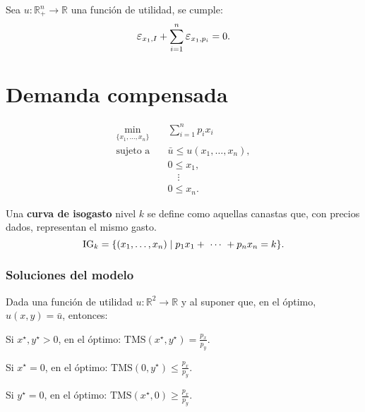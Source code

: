 \documentclass[8pt,a4paper]{extarticle}
\begin{document}
\begin{multicols}{3}
\begin{boxtheo}
	Sea $u : \mathbb{R}^n_+ \to \mathbb{R}$ una función de utilidad, se cumple:
	\[
		\E_{x_1, I} + \sum_{i=1}^{n} \E_{x_1, p_{i}} = 0
	.\] 
\end{boxtheo}

\newpage

\section{Demanda compensada}

\begin{equation*}
\begin{aligned}
	\min_{\{x_1, \ldots, x_n\}}\	  & \sum_{i=1}^{n} p_i x_i \\
	\text{sujeto a} \quad & \bar{u} \le u(x_1, \ldots, x_n), \\
						  & 0 \le x_1, \\
						  & \quad \vdots \\
						  & 0 \le x_n.
\end{aligned}
\end{equation*}

\begin{boxdef}
Una \textbf{curva de isogasto} nivel $k$ se define como aquellas canastas que, con precios dados, representan el mismo gasto. \\
$$\text{\normalfont IG}_k = \{(x_1, \ldots, x_n)  \mid p_1 x_1 +\ \cdots\ + p_n x_n = k\}.$$
\end{boxdef}

\subsubsection*{Soluciones del modelo}

Dada una función de utilidad $u : \mathbb{R}^2 \to \mathbb{R}$ y al suponer que, en el óptimo, $u(x, y) = \bar{u}$, entonces:

\begin{bulletlist}
\item Si $x^\star, y^\star > 0$, en el óptimo: $\displaystyle \text{TMS} (x^\star, y^\star) = \frac{p_x}{p_y}$.
\item Si $x^\star = 0$, en el óptimo: $\displaystyle \text{TMS} \left(0, y^\star \right) \le \frac{p_x}{p_y}$.
\item Si $y^\star = 0$, en el óptimo: $\displaystyle \text{TMS} \left(x^\star, 0\right) \ge \frac{p_x}{p_y}$.
\end{bulletlist}


\end{multicols}
\end{document}
